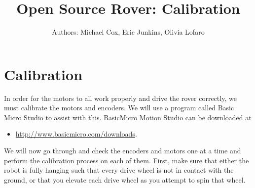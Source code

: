 \documentclass[12pt]{article}
\begin{document}
\title{Open Source Rover: Calibration}
\author{Authors: Michael Cox, Eric Junkins, Olivia Lofaro}

\makeatletter         
\def\@maketitle{
\begin{center}	
	\makebox[\textwidth][c]{ \texttt{[image: "Pictures/calibration".png]}}
	{\Huge \bfseries \sffamily \@title }\\[3ex] 
	{\Large \sffamily \@author}\\[3ex] 
	\texttt{[image: "Pictures/JPL logo".png]}
\end{center}}
\makeatother

\maketitle


\newpage


\tableofcontents




\section{Calibration}
\label{cal section}
In order for the motors to all work properly and drive the rover correctly, we must calibrate the motors and encoders. We will use a program called Basic Micro Studio to assist with this. BasicMicro Motion Studio can be downloaded at 
\begin{itemize}
	\item \href{http://www.basicmicro.com/downloads}{http://www.basicmicro.com/downloads}. 
\end{itemize}

\noindent We will now go through and check the encoders and motors one at a time and perform the calibration process on each of them. First, make sure that either the robot is fully hanging such that every drive wheel is not in contact with the ground, or that you elevate each drive wheel as you attempt to spin that wheel.
\end{document}
